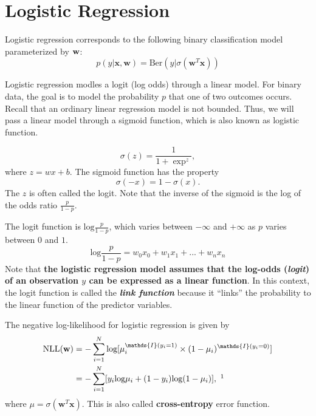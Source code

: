 \section{Logistic Regression}
\label{sec:logistic_regression}

Logistic regression corresponds to the following binary classification model parameterized by ${\mathbf{w}}$:
$$p(y|\mathbf{x},\mathbf{w})=\textrm{Ber}(y|\sigma(\mathbf{w}^T\mathbf{x}))$$

Logistic regression modles a logit (log odds) through a linear model. For binary data, the goal is to model the probability $p$ that one of two outcomes occurs. Recall that an ordinary linear regression model is not bounded. Thus, we will pass a linear model through a sigmoid function, which is also known as logistic function. 

$$\sigma(z) = \frac{1}{1+\exp^{z}},$$
where $z=wx+b.$
The sigmoid function has the property
$$\sigma(-x) = 1-\sigma(x).$$
The $z$ is often called the logit. Note that the inverse of the sigmoid is the log of the odds ratio $\frac{p}{1-p}.$

The logit function is $\textrm{log}\frac{p}{1-p}$, which varies between $-\infty$ and $+\infty$ as $p$ varies between $0$ and $1$.
$$\textrm{log}\frac{p}{1-p} = w_0x_0 +  w_1x_1 + ... + w_nx_n$$
Note that \textbf{the logistic regression model assumes that the log-odds (\textit{logit}) of an observation $y$ can be expressed as a linear function}. In this context, the logit function is called the \textbf{\textit{link function}} because it ``links'' the probability to the linear function of the predictor variables.



The negative log-likelihood for logistic regression is given by
\begin{align*}
	\textrm{NLL}(\mathbf{w}) &= -\sum_{i=1}^{N}\textrm{log}[\mu_i^{\mathds{I}(y_i=1)}\times (1-\mu_i)^{\mathds{I}(y_i=0)}]\\
	&=-\sum_{i=1}^{N}[y_i\textrm{log}\mu_i + (1-y_i) \textrm{log}(1-\mu_i)], \textrm{ }\footnotemark
\end{align*}
where $\mu=\sigma(\mathbf{w}^T\mathbf{x})$. This is also called \textbf{cross-entropy} error function. 

